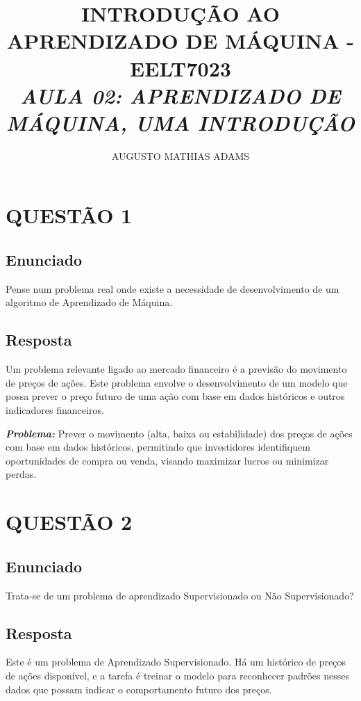 \documentclass[a4paper, 12pt, onecolumn,singlespacing]{article}
\title{\normalsize{INTRODUÇÃO AO APRENDIZADO DE MÁQUINA - EELT7023}\\ \huge{\textbf\textit{{AULA 02: APRENDIZADO DE MÁQUINA, UMA INTRODUÇÃO }}\\}}
\author{\small{AUGUSTO MATHIAS ADAMS}}
\begin{document}
	
	\maketitle
	
	\section{QUESTÃO 1}
	
	\subsection{Enunciado}
	
		Pense num problema real onde existe a necessidade de desenvolvimento de um algoritmo de Aprendizado de Máquina.
	
	\subsection{Resposta}
	
	Um problema relevante ligado ao mercado financeiro é a previsão do movimento de preços de ações. Este problema envolve o desenvolvimento de um modelo que possa prever o preço futuro de uma ação com base em dados históricos e outros indicadores financeiros.
	
	\textbf{\textit{Problema: }} Prever o movimento (alta, baixa ou estabilidade) dos preços de ações com base em dados históricos, permitindo que investidores identifiquem oportunidades de compra ou venda, visando maximizar lucros ou minimizar perdas.
	
	\section{QUESTÃO 2}
	
	\subsection{Enunciado}
	Trata-se de um problema de aprendizado Supervisionado ou Não Supervisionado?
	
	\subsection{Resposta}
	
	Este é um problema de Aprendizado Supervisionado. Há um histórico de preços de ações disponível, e a tarefa é treinar o modelo para reconhecer padrões nesses dados que possam indicar o comportamento futuro dos preços.
	
\end{document}
